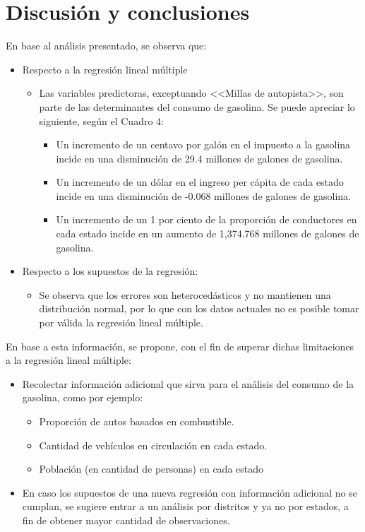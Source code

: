 \documentclass[a4paper,10pt]{article}\usepackage[]{graphicx}\usepackage[]{color}
\begin{document}
\section{Discusión y conclusiones}

En base al análisis presentado, se observa que:
\begin{itemize}
  \item Respecto a la regresión lineal múltiple
      \begin{itemize}
          \item Las variables predictoras, exceptuando <<Millas de autopista>>, son parte de las determinantes del consumo de gasolina. Se puede apreciar lo siguiente, según el Cuadro 4:
              \begin{itemize}
                  \item Un incremento de un centavo por galón en el impuesto a la gasolina incide en una disminución de 29.4 millones de galones de gasolina.
                  \item Un incremento de un dólar en el ingreso per cápita de cada estado incide en una disminución de -0.068 millones de galones de gasolina.
                  \item Un incremento de un 1 por ciento de la proporción de conductores en cada estado incide en un aumento de 1,374.768 millones de galones de gasolina.
            \end{itemize}
      \end{itemize}
  \item Respecto a los supuestos de la regresión:
    \begin{itemize}
      \item Se observa que los errores son heterocedásticos y no mantienen una distribución normal, por lo que con los datos actuales no es posible tomar por válida la regresión lineal múltiple.
    \end{itemize}
\end{itemize}

En base a esta información, se propone, con el fin de superar dichas limitaciones a la regresión lineal múltiple:

\begin{itemize}
  \item Recolectar información adicional que sirva para el análisis del consumo de la gasolina, como por ejemplo:
      \begin{itemize}
          \item Proporción de autos basados en combustible.
          \item Cantidad de vehículos en circulación en cada estado.
          \item Población (en cantidad de personas) en cada estado
      \end{itemize}
  \item En caso los supuestos de una nueva regresión con información adicional no se cumplan, se sugiere entrar a un análisis por distritos y ya no por estados, a fin de obtener mayor cantidad de observaciones.

\end{itemize}
\end{document}
